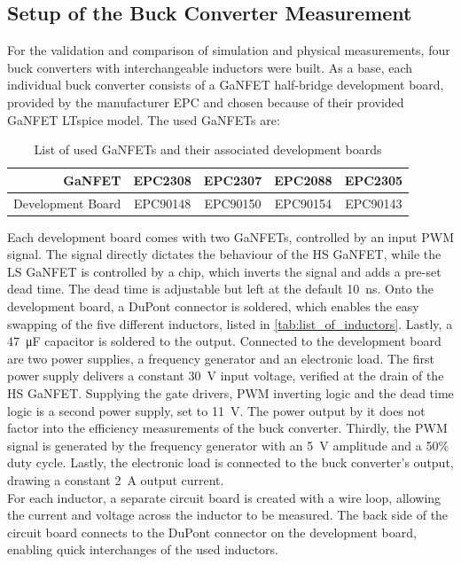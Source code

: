 \subsection{Setup of the Buck Converter Measurement}\label{sec:setup_of_the_buck_converter}
For the validation and comparison of simulation and physical measurements, four buck converters with interchangeable inductors were built. As a base, each individual buck converter consists of a \ac{GaNFET} half-bridge development board, provided by the manufacturer EPC and chosen because of their provided \ac{GaNFET} LTspice model. The used \acp{GaNFET} are:
\begin{table}[H]
    \centering
    \caption{List of used \acp{GaNFET} and  their associated development boards}
    \begin{tabular}{|r|c|c|c|c|}
        \hline
        \ac{GaNFET} & EPC2308 & EPC2307 & EPC2088 & EPC2305 \\
        \hline
        Development Board & EPC90148 & EPC90150 & EPC90154 & EPC90143\\
        \hline
    \end{tabular}
    \label{tab:list_of_GaNFETs}
\end{table}
Each development board comes with two \acp{GaNFET}, controlled by an input \ac{PWM} signal. The signal directly dictates the behaviour of the \ac{HS} \ac{GaNFET}, while the \ac{LS} \ac{GaNFET} is controlled by a chip, which inverts the signal and adds a pre-set dead time. The dead time is adjustable but left at the default \SI{10}{\nano\s}. Onto the development board, a DuPont connector is soldered, which enables the easy swapping of the five different inductors, listed in \ref{tab:list_of_inductors}. Lastly, a \SI{47}{\micro\F} capacitor is soldered to the output. Connected to the development board are two power supplies, a frequency generator and an electronic load. The first power supply delivers a constant \SI{30}{\V} input voltage, verified at the drain of the \ac{HS} \ac{GaNFET}. Supplying the gate drivers, \ac{PWM} inverting logic and the dead time logic is a second power supply, set to \SI{11}{\V}. The power output by it does not factor into the efficiency measurements of the buck converter. Thirdly, the \ac{PWM} signal is generated by the frequency generator with an \SI{5}{\V} amplitude and a 50\% duty cycle. Lastly, the electronic load is connected to the buck converter's output, drawing a constant \SI{2}{\A} output current.\\
For each inductor, a separate circuit board is created with a wire loop, allowing the current and voltage across the inductor to be measured. The back side of the circuit board connects to the DuPont connector on the development board, enabling quick interchanges of the used inductors.

